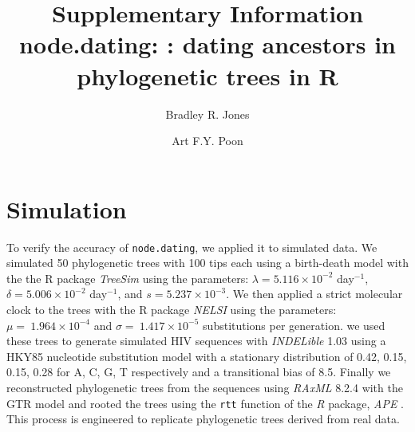 \documentclass[12pt]{article}
\newcommand{\code}[1]{{\tt #1}}
\begin{document}
\title{Supplementary Information \\ node.dating: : dating ancestors in phylogenetic trees in R}

\author[1,2,*]{Bradley R. Jones}
\author[2,3]{Art F.Y. Poon}

\date{}

\maketitle

\section{Simulation} \label{sec:sim}
To verify the accuracy of \code{node.dating}, we applied it to simulated data.
We simulated 50 phylogenetic trees with 100 tips each using a birth-death model with the the R package \emph{TreeSim} \citep{TreeSim} using the parameters: $\lambda = 5.116 \times 10^{-2}$ day$^{-1}$, $\delta = 5.006 \times 10^{-2}$ day$^{-1}$, and $s = 5.237 \times 10^{-3}$.
We then applied a strict molecular clock to the trees with the R package \emph{NELSI} \citep{NELSI} using the parameters: $\mu = \ 1.964\times 10^{-4}$ and $\sigma = \ 1.417\times 10^{-5}$ substitutions per generation.
we used these trees to generate simulated HIV sequences with \emph{INDELible} 1.03 \citep{Indelible09} using a HKY85 nucleotide substitution model \citep{HKY85} with a stationary distribution of 0.42, 0.15, 0.15, 0.28 for A, C, G, T respectively and a transitional bias of 8.5.
Finally we reconstructed phylogenetic trees from the sequences using \emph{RAxML} 8.2.4 \citep{Raxml14} with the GTR model and rooted the trees using the \code{rtt} function of the \emph{R} package, \emph{APE} \citep{APE}.
This process is engineered to replicate phylogenetic trees derived from real data.
\end{document}
